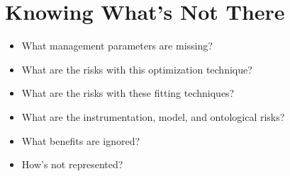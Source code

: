 \documentclass[11pt,a5paper]{book}
\begin{document}
\section{Knowing What's Not There}
\begin{itemize}
\item What management parameters are missing?
\item What are the risks with this optimization technique?
\item What are the risks with these fitting techniques?
\item What are the instrumentation, model, and ontological risks?
\item What benefits are ignored?
\item How's not represented?
\end{itemize}
\end{document}
